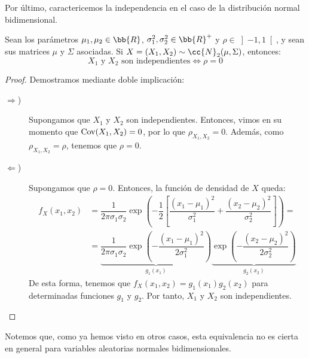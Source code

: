 Por último, caractericemos la independencia en el caso de la distribución normal bidimensional.
\begin{prop}
    Sean los parámetros $\mu_1, \mu_2\in \bb{R}$, $\sigma_1^2, \sigma_2^2\in \bb{R}^+$ y $\rho\in \left]-1,1\right[$, y sean sus matrices $\mu$ y $\Sigma$ asociadas.
    Si $X=(X_1, X_2)\sim \cc{N}_2(\mu, \Sigma)$, entonces:
    \begin{equation*}
        X_1\text{ y }X_2\text{ son independientes}\iff \rho=0
    \end{equation*}
\end{prop}
\begin{proof}
    Demostramos mediante doble implicación:
    \begin{description}
        \item[$\Longrightarrow$)] Supongamos que $X_1$ y $X_2$ son independientes. Entonces, vimos en su momento que $\operatorname{Cov}(X_1, X_2)=0$, por lo que $\rho_{X_1, X_2}=0$. Además, como $\rho_{X_1, X_2}=\rho$, tenemos que $\rho=0$.
        
        \item[$\Longleftarrow$)] Supongamos que $\rho=0$. Entonces, la función de densidad de $X$ queda:
        \begin{align*}
            f_X(x_1,x_2)&=\dfrac{1}{2\pi\sigma_1\sigma_2}\exp\left(-\dfrac{1}{2}\left[\dfrac{(x_1-\mu_1)^2}{\sigma_1^2}+\dfrac{(x_2-\mu_2)^2}{\sigma_2^2}\right]\right)
            =\\&= \underbrace{\dfrac{1}{2\pi\sigma_1\sigma_2}\exp\left(-\dfrac{(x_1-\mu_1)^2}{2\sigma_1^2}\right)}_{g_1(x_1)}\underbrace{\exp\left(-\dfrac{(x_2-\mu_2)^2}{2\sigma_2^2}\right)}_{g_2(x_2)}
        \end{align*}
        De esta forma, tenemos que $f_X(x_1,x_2)=g_1(x_1)g_2(x_2)$ para determinadas funciones $g_1$ y $g_2$. Por tanto, $X_1$ y $X_2$ son independientes.
    \end{description}
\end{proof}
Notemos que, como ya hemos visto en otros casos, esta equivalencia no es cierta en general para variables aleatorias normales bidimensionales.